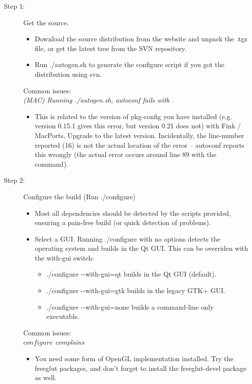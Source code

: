 \begin{description}
	\item[Step 1:\its] Get the source.
	\begin{itemize}
		\item Download the source distribution from the website and unpack the .tgz file, or get the latest tree from the SVN repository.
		\item Run {\sffamily ./autogen.sh} to generate the {\sffamily configure} script if you got the distribution using svn.
	\end{itemize}
	Common issues:\\
	\emph{(MAC) Running {\sffamily ./autogen.sh}, autoconf fails with .}
	\begin{itemize}
		\item This is related to the version of pkg-config you have installed (e.g. version 0.15.1 gives this error, but version 0.21 does not) with Fink / MacPorts. Upgrade to the latest version. Incidentally, the line-number reported (16) is not the actual location of the error -- autoconf reports this wrongly (the actual error occurs around line 89 with the \qte{PKG\_CHECK\_MODULES(GTK28, ..., [AC\_DEFINE...} command).
	\end{itemize}
\end{description}

\begin{description}
	\item[Step 2:\its] Configure the build (Run {\sffamily./configure})
	\begin{itemize}
		\item Most all dependencies should be detected by the scripts provided, ensuring a pain-free build (or quick detection of problems).
		\item Select a GUI. Running {\sffamily./configure} with no options detects the operating system and builds in the Qt GUI. This can be overriden with the {\sffamily {-}{-}with-gui} switch:
		\begin{itemize}
			\item {\sffamily./configure {-}{-}with-gui=qt} builds in the Qt GUI (default).
			\item {\sffamily./configure {-}{-}with-gui=gtk} builds in the legacy GTK+ GUI.
			\item {\sffamily./configure {-}{-}with-gui=none} builds a command-line only executable.
		\end{itemize}
	\end{itemize}
	Common issues:\\
	\emph{$configure$ complains }
	\begin{itemize}
		\item You need some form of OpenGL implementation installed. Try the freeglut packages, and don't forget to install the freeglut-devel package as well.
	\end{itemize}
\end{description}

